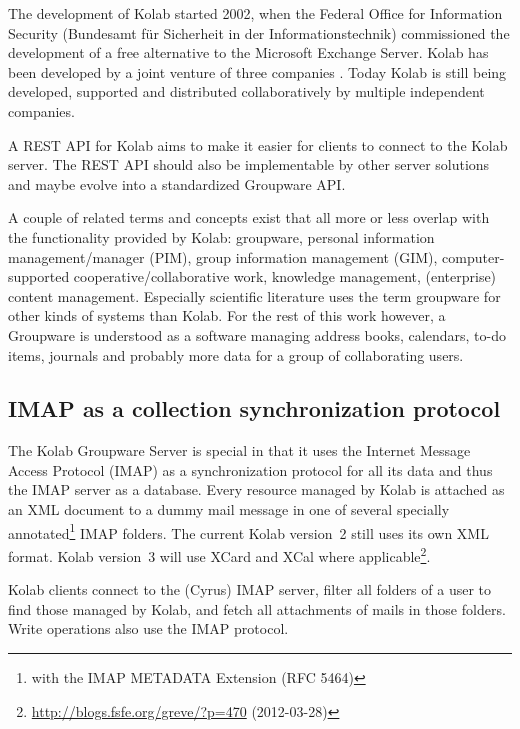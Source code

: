 \documentclass[11pt,a4paper,headsepline,twoside]{scrartcl}		%
\newcommand{\citeurl}[2]{\url{#1} (#2)}
\begin{document}
The development of Kolab started 2002, when the Federal Office for Information
Security (Bundesamt für Sicherheit in der Informationstechnik) commissioned the
development of a free alternative to the Microsoft Exchange Server. Kolab has
been developed by a joint venture of three companies \cite{Stoermer2004}. Today
Kolab is still being developed, supported and distributed collaboratively by
multiple independent companies.

A REST API for Kolab aims to make it easier for clients to connect to the Kolab
server. The REST API should also be implementable by other server solutions and
maybe evolve into a standardized Groupware API.

A couple of related terms and concepts exist that all more or less overlap with
the functionality provided by Kolab: groupware, personal information
management/manager (PIM), group information management (GIM), computer-supported
cooperative/collaborative work, knowledge management, (enterprise) content
management. Especially scientific literature uses the term groupware for other
kinds of systems than Kolab\cite[sec. 2.1]{Stoermer2004}. For the rest of this
work however, a Groupware is understood as a software managing address books,
calendars, to-do items, journals and probably more data for a group of
collaborating users.

\subsection{IMAP as a collection synchronization protocol}
\label{sec:imap-as-collection}

The Kolab Groupware Server is special in that it uses the Internet Message
Access Protocol (IMAP) as a synchronization protocol for all its data and thus
the IMAP server as a database. Every resource managed by Kolab is attached as an
XML document to a dummy mail message in one of several specially
annotated\footnote{with the IMAP METADATA Extension (RFC 5464)} IMAP
folders. The current Kolab version~2 still uses its own XML format. Kolab
version~3 will use XCard and XCal where
applicable\footnote{\citeurl{http://blogs.fsfe.org/greve/?p=470}{2012-03-28}}.

Kolab clients connect to the (Cyrus) IMAP server, filter all folders of a user
to find those managed by Kolab, and fetch all attachments of mails in those
folders. Write operations also use the IMAP protocol.
\end{document}
